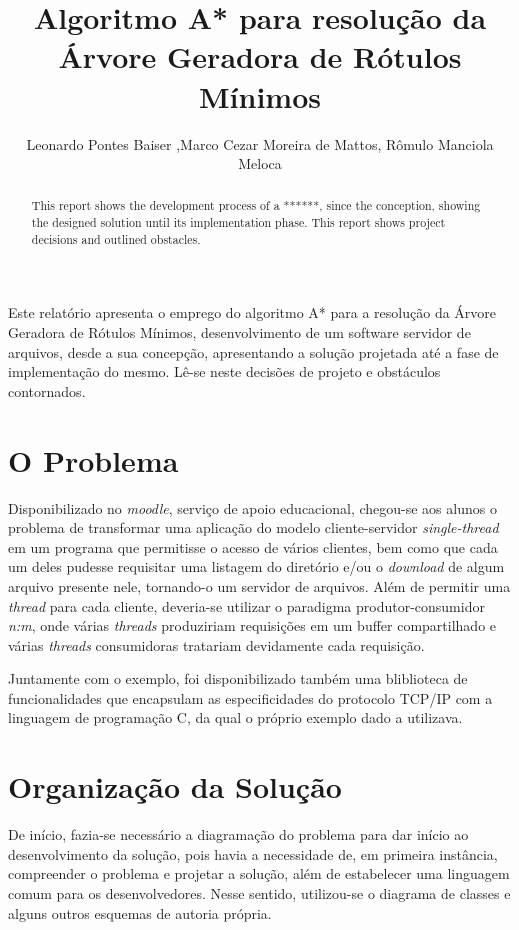 \documentclass[12pt]{article}
\title{Algoritmo A* para resolução da Árvore Geradora de Rótulos Mínimos}
\author{Leonardo Pontes Baiser\inst{1} ,Marco Cezar Moreira de Mattos\inst{1}, Rômulo Manciola Meloca\inst{1}}
\begin{document}
\maketitle

\begin{abstract}
  This report shows the development process of a ******, since the conception, showing the designed solution until its implementation phase. This report shows project decisions and outlined obstacles.
\end{abstract}
     
\begin{resumo} 
  Este relatório apresenta o emprego do algoritmo A* para a resolução da Árvore Geradora de Rótulos Mínimos, desenvolvimento de um software servidor de arquivos, desde a sua concepção, apresentando a solução projetada até a fase de implementação do mesmo. Lê-se neste decisões de projeto e obstáculos contornados.
\end{resumo}

\section{O Problema}\label{sec:problema}

Disponibilizado no \textit{moodle}, serviço de apoio educacional, chegou-se aos alunos o problema de transformar uma aplicação do modelo cliente-servidor \textit{single-thread} em um programa que permitisse o acesso de vários clientes, bem como que cada um deles pudesse requisitar uma listagem do diretório e/ou o \textit{download} de algum arquivo presente nele, tornando-o um servidor de arquivos. Além de permitir uma \textit{thread} para cada cliente, deveria-se utilizar o paradigma produtor-consumidor \emph{n:m}, onde várias \textit{threads} produziriam requisições em um buffer compartilhado e várias \textit{threads} consumidoras tratariam devidamente cada requisição.

Juntamente com o exemplo, foi disponibilizado também uma bliblioteca de funcionalidades que encapsulam as especificidades do protocolo TCP/IP com a linguagem de programação C, da qual o próprio exemplo dado a utilizava.

\section{Organização da Solução}\label{sec:solucao}

De início, fazia-se necessário a diagramação do problema para dar início ao desenvolvimento da solução, pois havia a necessidade de, em primeira instância, compreender o problema e projetar a solução, além de estabelecer uma linguagem comum para os desenvolvedores. Nesse sentido, utilizou-se o diagrama de classes e alguns outros esquemas de autoria própria.
\end{document}
